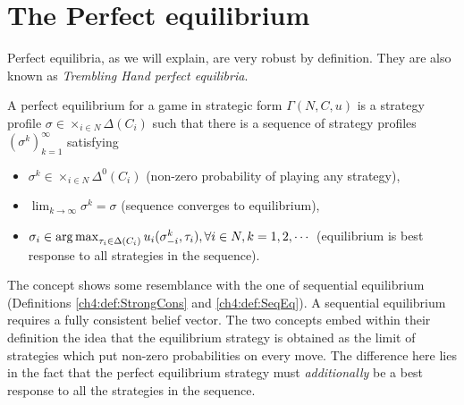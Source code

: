 \section{The Perfect equilibrium}

Perfect equilibria, as we will explain, are very robust by definition. They are also known as \emph{Trembling Hand perfect equilibria}.\\
\begin{definition}
A perfect equilibrium for a game in strategic form $\Gamma(N,C,u)$ is a strategy profile $\sigma \in \times_{i \in N} \Delta (C_i)$ such that there is a sequence of strategy profiles $ (\sigma^k)_{k = 1}^\infty$ satisfying
\begin{itemize}
\item $\sigma^k \in \times_{i \in N} \Delta^0 (C_i)$ (non-zero probability of playing any strategy),
\item $\lim_{k \rightarrow \infty} \sigma^k = \sigma$ (sequence converges to equilibrium),
\item $ \sigma_i \in \operatorname*{arg\,max}_{\tau_i \in \Delta(C_i)}u_i(\sigma^k_{-i}, \tau_i), \forall i \in N, k = 1,2, \cdots $ (equilibrium is best response to all strategies in the sequence).
\end{itemize}
\label{ch5:def:perfectEq}
\end{definition}
The concept shows some resemblance with the one of sequential equilibrium (Definitions \ref{ch4:def:StrongCons} and \ref{ch4:def:SeqEq}). A sequential equilibrium requires a fully consistent belief vector. The two concepts embed within their definition the idea that the equilibrium strategy is obtained as the limit of strategies which put non-zero probabilities on every move. The difference here lies in the fact that the perfect equilibrium strategy must \emph{additionally} be a best response to all the strategies in the sequence.
